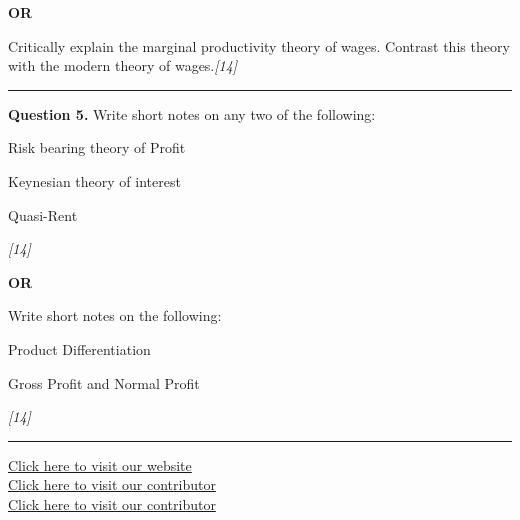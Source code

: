 \documentclass[11pt,a4paper]{article}
\newcommand{\pts}[1]{\hfill   \textit{[#1]}}
\begin{document}
\centerline{   \textbf{OR}}

Critically explain the marginal productivity theory of wages. Contrast this theory with the modern theory of wages.\pts{14}

\medskip\rule{\linewidth}{0.2pt}




\noindent   \textbf{Question 5.}
Write short notes on any two of the following:

\begin{parts}
  \item Risk bearing theory of Profit
  \item Keynesian theory of interest
  \item Quasi-Rent
\end{parts}\pts{14}

\centerline{   \textbf{OR}}

Write short notes on the following:

\begin{parts}
  \item Product Differentiation
  \item Gross Profit and Normal Profit
\end{parts}\pts{14}

\vfill
\rule{\linewidth}{0.4pt}

\begin{center}\small
\href{https://bhu-exam.vercel.app/}{Click here to visit our website}\\[4pt]
\href{https://me-aryan.vercel.app/}{Click here to visit our contributor}\\[4pt]
\href{https://quashan-me.vercel.app/}{Click here to visit our contributor}
\end{center}
\end{document}
